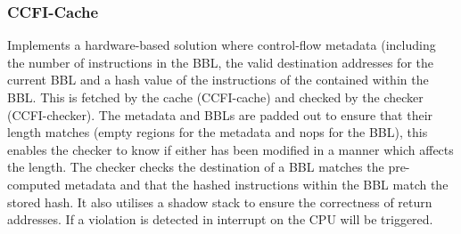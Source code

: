 \subsubsection{CCFI-Cache}
Implements a hardware-based solution where control-flow metadata (including the number of instructions in the BBL, the valid destination addresses for the current BBL and a hash value of the instructions of the contained within the BBL. This is fetched by the cache (CCFI-cache) and checked by the checker (CCFI-checker). The metadata and BBLs are padded out to ensure that their length matches (empty regions for the metadata and nops for the BBL), this enables the checker to know if either has been modified in a manner which affects the length. The checker checks the destination of a BBL matches the pre-computed metadata and that the hashed instructions within the BBL match the stored hash. It also utilises a shadow stack to ensure the correctness of return addresses. If a violation is detected in interrupt on the CPU will be triggered.